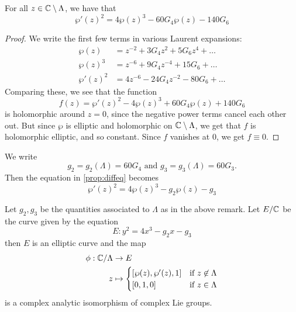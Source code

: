 \begin{proposition}
	\label{prop:diffeq}
	For all $z \in \mathbb{C} \setminus \Lambda$, we have that
	\begin{equation*}
		\wp'(z)^2 = 4\wp(z)^3 - 60G_4\wp(z) - 140G_6
	\end{equation*}
\end{proposition}

\begin{proof}
	We write the first few terms in various Laurent expansions:
	\begin{align*}
		\wp(z) &= z^{-2} + 3G_4z^2 + 5G_6z^4 + \dots\\
		\wp(z)^3 &= z^{-6} + 9G_4z^{-4} + 15G_6 + \dots\\
		\wp'(z)^2 &= 4z^{-6} - 24G_4z^{-2} - 80G_6 + \dots
	\end{align*}
	Comparing these, we see that the function
	\begin{equation*}
		f(z) = \wp'(z)^2 - 4\wp(z)^3 + 60G_4\wp(z) + 140G_6
	\end{equation*}
	is holomorphic around $z = 0$, since the negative power terms cancel
	each other out. But since $\wp$ is elliptic and holomorphic on $\mathbb{C} \setminus
	\Lambda$, we get that $f$ is holomorphic elliptic, and so constant.
	Since $f$ vanishes at $0$, we get $f\equiv 0$.
\end{proof}

\begin{remark}
	We write
	\begin{equation*}
		g_2 = g_2(\Lambda) = 60G_4
		\textrm{ and }
		g_3 = g_3(\Lambda) = 60G_3.
	\end{equation*}
	Then the equation in \ref{prop:diffeq} becomes
	\begin{equation*}
		\wp'(z)^2 = 4\wp(z)^3 - g_2\wp(z) - g_3
	\end{equation*}
\end{remark}

\begin{theorem}
	\label{thm:lattice-curve}
	Let $g_2, g_3$ be the quantities associated to $\Lambda$ as in the above
	remark.
	Let $E/\mathbb{C}$ be the curve given by the equation
	\begin{equation*}
		E: y^2 = 4x^3 - g_2 x - g_3
	\end{equation*}
	then $E$ is an elliptic curve and the map
	\begin{align*}
		\phi: \mathbb{C}/\Lambda &\to E\\
		z &\mapsto 
		\begin{cases}
			[\wp(z), \wp'(z), 1] &\textrm{if } z \not\in \Lambda\\
			[0, 1, 0] &\textrm{if } z \in \Lambda
		\end{cases}
	\end{align*}
	is a complex analytic isomorphism of complex Lie groups.
\end{theorem}

